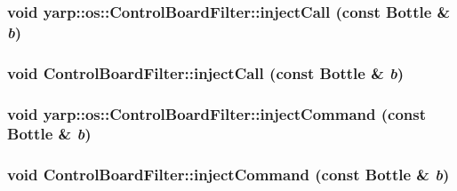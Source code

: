 \label{classyarp_1_1os_1_1_control_board_filter_a97baafa3310ec3ecad9c348c29c8b09c}
\hypertarget{classyarp_1_1os_1_1_control_board_filter_ab78bfa155e19e516ec6cf7cb39b3d8ac}{
\subsubsection[{injectCall}]{\setlength{\rightskip}{0pt plus 5cm}void yarp::os::ControlBoardFilter::injectCall (const Bottle \& {\em b})}}
\label{classyarp_1_1os_1_1_control_board_filter_ab78bfa155e19e516ec6cf7cb39b3d8ac}
\hypertarget{classyarp_1_1os_1_1_control_board_filter_a46da5eabf941da5694107bf2d4adc075}{
\subsubsection[{injectCall}]{\setlength{\rightskip}{0pt plus 5cm}void ControlBoardFilter::injectCall (const Bottle \& {\em b})}}
\label{classyarp_1_1os_1_1_control_board_filter_a46da5eabf941da5694107bf2d4adc075}
\hypertarget{classyarp_1_1os_1_1_control_board_filter_a8fcab8021e1d19529dd6de96312f9ce6}{
\subsubsection[{injectCommand}]{\setlength{\rightskip}{0pt plus 5cm}void yarp::os::ControlBoardFilter::injectCommand (const Bottle \& {\em b})}}
\label{classyarp_1_1os_1_1_control_board_filter_a8fcab8021e1d19529dd6de96312f9ce6}
\hypertarget{classyarp_1_1os_1_1_control_board_filter_a329bcebdddb5afbd7a5e7303e6941311}{
\subsubsection[{injectCommand}]{\setlength{\rightskip}{0pt plus 5cm}void ControlBoardFilter::injectCommand (const Bottle \& {\em b})}}
